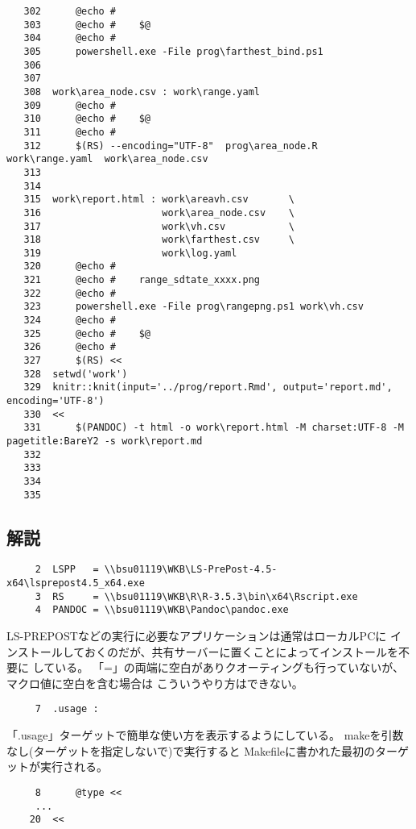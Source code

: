 \documentclass[dvipdfmx]{jsarticle}
\begin{document}
\begin{verbatim}
   302		@echo #
   303		@echo #    $@
   304		@echo #
   305		powershell.exe -File prog\farthest_bind.ps1
   306	
   307	
   308	work\area_node.csv : work\range.yaml
   309		@echo #
   310		@echo #    $@
   311		@echo #
   312		$(RS) --encoding="UTF-8"  prog\area_node.R  work\range.yaml  work\area_node.csv
   313	
   314	
   315	work\report.html : work\areavh.csv       \
   316	                   work\area_node.csv    \
   317					   work\vh.csv           \
   318					   work\farthest.csv     \
   319	                   work\log.yaml
   320		@echo #
   321		@echo #    range_sdtate_xxxx.png
   322		@echo #
   323		powershell.exe -File prog\rangepng.ps1 work\vh.csv
   324		@echo #
   325		@echo #    $@
   326		@echo #
   327		$(RS) <<
   328	setwd('work')
   329	knitr::knit(input='../prog/report.Rmd', output='report.md', encoding='UTF-8')
   330	<<
   331		$(PANDOC) -t html -o work\report.html -M charset:UTF-8 -M pagetitle:BareY2 -s work\report.md
   332	
   333	
   334	
   335	

\end{verbatim}

\subsection{解説}

\begin{verbatim}
     2	LSPP   = \\bsu01119\WKB\LS-PrePost-4.5-x64\lsprepost4.5_x64.exe
     3	RS     = \\bsu01119\WKB\R\R-3.5.3\bin\x64\Rscript.exe
     4	PANDOC = \\bsu01119\WKB\Pandoc\pandoc.exe
\end{verbatim}

LS-PREPOSTなどの実行に必要なアプリケーションは通常はローカルPCに
インストールしておくのだが、共有サーバーに置くことによってインストールを不要に
している。
「=」の両端に空白がありクオーティングも行っていないが、マクロ値に空白を含む場合は
こういうやり方はできない。

\begin{verbatim}
     7	.usage :
\end{verbatim}

「.usage」ターゲットで簡単な使い方を表示するようにしている。
makeを引数なし(ターゲットを指定しないで)で実行すると
Makefileに書かれた最初のターゲットが実行される。

\begin{verbatim}
     8		@type <<
     ...
    20	<<
\end{verbatim}
\end{document}
